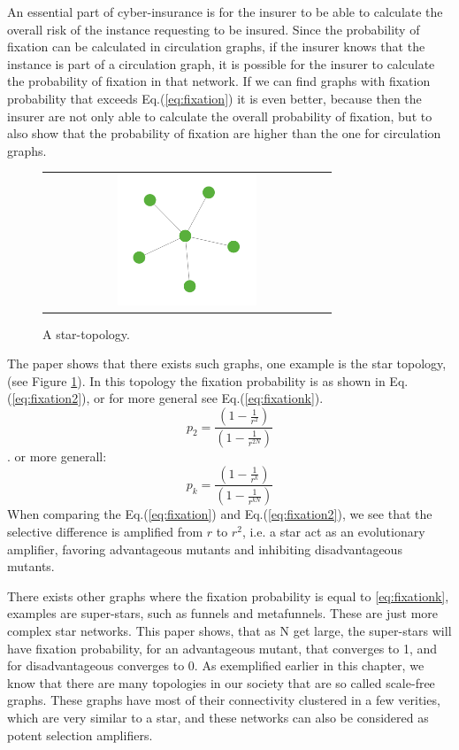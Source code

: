 An essential part of cyber-insurance is for the insurer to be able to calculate the overall risk of the instance requesting to be insured. Since the probability of fixation can be calculated in circulation graphs, if the insurer knows that the instance is part of a circulation graph, it is possible for the insurer to calculate the probability of fixation in that network. 
If we can find graphs with fixation probability that exceeds Eq.(\ref{eq:fixation}) it is even better, because then the insurer are not only able to calculate the overall probability of fixation, but to also show that the probability of fixation are higher than the one for circulation graphs.
\begin{figure}[b]
\centering
\begin{tabular}{@{}c@{}}
\includegraphics[width=0.5\textwidth]{../Figures/aStar.png}
\end{tabular}
\caption{
\label{fig:star} A star-topology. 
}
\end{figure}
The paper shows that there exists such graphs, one example is the star topology, (see Figure \ref{fig:star}).
In this topology the fixation probability is as shown in Eq.(\ref{eq:fixation2}), or for more general see Eq.(\ref{eq:fixationk}). \begin{equation}p_{2}=\frac{(1-\frac{1}{r^{2}})}{(1-\frac{1}{r^{2N}})} \label{eq:fixation2} \end{equation}.
or more generall: \begin{equation}
p_{k}=\frac{(1-\frac{1}{r^{k}})}{(1-\frac{1}{r^{kN}})} \label{eq:fixationk}
\end{equation}
 When comparing the Eq.(\ref{eq:fixation}) and Eq.(\ref{eq:fixation2}), we see that the selective difference is
 amplified from $r$ to $r^{2}$, i.e. a star act as an evolutionary amplifier, favoring advantageous
  mutants and inhibiting disadvantageous mutants.

There exists other graphs where the fixation probability is equal to \ref{eq:fixationk}, examples are super-stars, such as funnels and
metafunnels. These are just more complex star networks. This paper shows, that as N get large, the super-stars will have fixation probability, for an advantageous mutant, that converges to 1, and for disadvantageous converges to 0. 
As exemplified earlier in this chapter, we know that there are many
topologies in our society that are so called scale-free graphs. These graphs have most of their connectivity clustered in a few verities, which are very similar to a star, and these networks can also be considered as potent selection amplifiers. 


